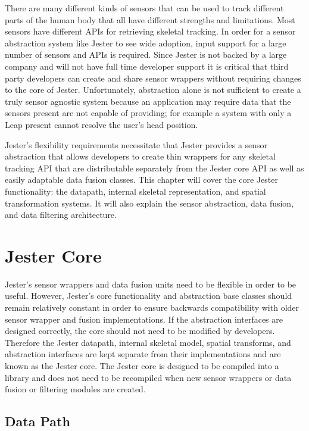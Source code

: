 There are many different kinds of sensors that can be used to track different parts of the human body that all have different strengths and limitations. Most sensors have different APIs for retrieving skeletal tracking. In order for a sensor abstraction system like Jester to see wide adoption, input support for a large number of sensors and APIs is required. Since Jester is not backed by a large company and will not have full time developer support it is critical that third party developers can create and share sensor wrappers without requiring changes to the core of Jester. Unfortunately, abstraction alone is not sufficient to create a truly sensor agnostic system because an application may require data that the sensors present are not capable of providing; for example a system with only a Leap present cannot resolve the user's head position. 

Jester's flexibility requirements necessitate that Jester provides a sensor abstraction that allows developers to create thin wrappers for any skeletal tracking API that are distributable separately from the Jester core API as well as easily adaptable data fusion classes. This chapter will cover the core Jester functionality: the datapath, internal skeletal representation, and spatial transformation systems. It will also explain the sensor abstraction, data fusion, and data filtering architecture.

\section{Jester Core}\label{sec:jester_core}

Jester's sensor wrappers and data fusion units need to be flexible in order to be useful. However, Jester's core functionality and abstraction base classes should remain relatively constant in order to ensure backwards compatibility with older sensor wrapper and fusion implementations. If the abstraction interfaces are  designed correctly, the core should not need to be modified by developers. Therefore the Jester datapath, internal skeletal model, spatial transforms, and abstraction interfaces are kept separate from their implementations and are known as the Jester core. The Jester core is designed to be compiled into a library and does not need to be recompiled when new sensor wrappers or data fusion or filtering modules are created.

\subsection{Data Path}

